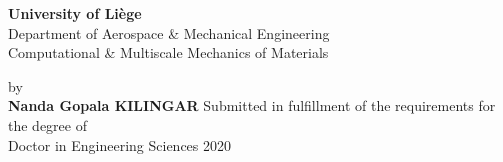 \begin{titlepage}
\begin{minipage}[c]{0.7\linewidth}
\textbf{University of Li\`{e}ge}\\
Department of Aerospace \& Mechanical Engineering\\
Computational \& Multiscale Mechanics of Materials
\end{minipage}\hfill
\begin{minipage}[c]{0.3\linewidth}
\end{minipage}
\vfill
\centering
\Large{\textbf{\thesistitle}}
\vfill
{by}\\
\vspace*{0.5cm}
\textbf{Nanda Gopala KILINGAR}
\vfill
\normalsize{Submitted in fulfillment of the requirements for the degree of\\
Doctor in Engineering Sciences}
\vfill
2020
\vfill
\end{titlepage}
